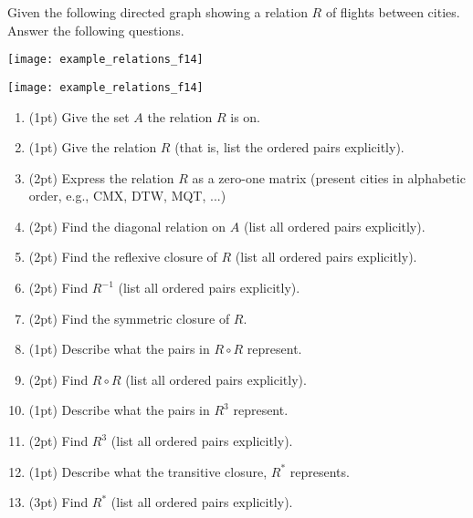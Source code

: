 \begin{questions}

Given the following directed graph showing a relation $R$ of flights between cities.  Answer the following questions.
	\ifprintanswers
	\begin{center}
	    \texttt{[image: example\_relations\_f14]}
	\end{center}
	\else
	\begin{center}
		\texttt{[image: example\_relations\_f14]}
	\end{center}
	\fi

	\ifprintanswers
	\else
	\begin{enumerate}[label=(\alph*),itemsep=0pt,parsep=0pt,topsep=0pt,partopsep=0pt]
		\item (1pt) Give the set $A$ the relation $R$ is on.
		\item (1pt) Give the relation $R$ (that is, list the ordered pairs explicitly).
		\item (2pt) Express the relation $R$ as a zero-one matrix (present cities in alphabetic order, e.g., CMX, DTW, MQT, ...)
		\item (2pt) Find the diagonal relation on $A$ (list all ordered pairs explicitly). 
		\item (2pt) Find the reflexive closure of $R$ (list all ordered pairs explicitly).
		\item (2pt) Find $R^{-1}$ (list all ordered pairs explicitly).
		\item (2pt) Find the symmetric closure of $R$. 
		\item (1pt) Describe what the pairs in $R \circ R$ represent.
		\item (2pt) Find $R \circ R$ (list all ordered pairs explicitly). 
		\item (1pt) Describe what the pairs in $R^3$ represent.
		\item (2pt) Find $R^3$ (list all ordered pairs explicitly).
		\item (1pt) Describe what the transitive closure, $R^{*}$ represents.
		\item (3pt) Find $R^{*}$ (list all ordered pairs explicitly).
	\end{enumerate}
	\fi


\end{questions}

